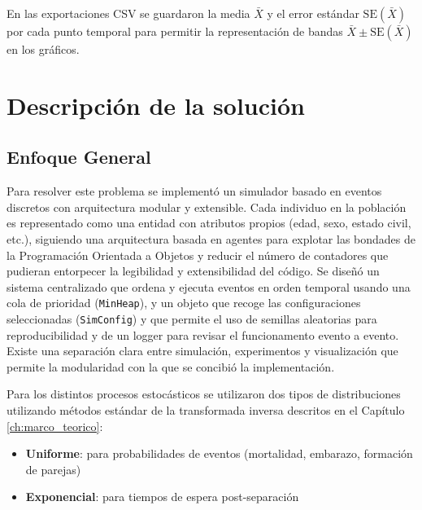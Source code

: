 \documentclass[12pt, a4paper, spanish]{report}
\begin{document}
En las exportaciones CSV se guardaron la media $\bar{X}$ y el error estándar $\mathrm{SE}(\bar{X})$ por cada punto temporal para permitir la representación de bandas $\bar{X}\pm\mathrm{SE}(\bar{X})$ en los gráficos.

\chapter{ Descripción de la solución}

\section{Enfoque General}\label{sec:general_approach}

Para resolver este problema se implementó un simulador basado en eventos discretos con arquitectura modular y extensible. Cada individuo en la población es representado como una entidad con atributos propios (edad, sexo, estado civil, etc.), siguiendo una arquitectura basada en agentes para explotar las bondades de la Programación Orientada a Objetos y reducir el número de contadores que pudieran entorpecer la legibilidad y extensibilidad del código. Se diseñó un sistema centralizado que ordena y ejecuta eventos en orden temporal usando una cola de prioridad (\texttt{MinHeap}), y un objeto que recoge las configuraciones seleccionadas (\texttt{SimConfig}) y que permite el uso de semillas aleatorias para reproducibilidad y de un logger para revisar el funcionamento evento a evento. Existe una separación clara entre simulación, experimentos y visualización que permite la modularidad con la que se concibió la implementación.

Para los distintos procesos estocásticos se utilizaron dos tipos de distribuciones utilizando métodos estándar de la transformada inversa descritos en el Capítulo \ref{ch:marco_teorico}:

\begin{itemize}
    \item \textbf{Uniforme}: para probabilidades de eventos (mortalidad, embarazo, formación de parejas)
    \item \textbf{Exponencial}: para tiempos de espera post-separación
\end{itemize}
\end{document}
